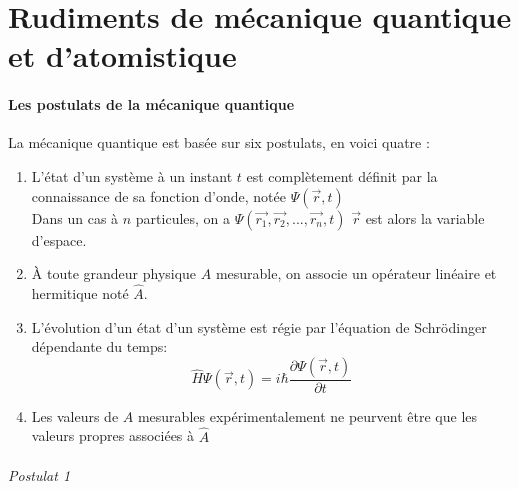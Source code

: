 \documentclass[../main.tex]{subfile}
\begin{document}
\part{Rudiments de mécanique quantique et d'atomistique}
\subsection{Les postulats de la mécanique quantique}

La mécanique quantique est basée sur six postulats, en voici quatre :\\
\begin{enumerate}
         \item L'état d'un système à un instant $t$ est complètement définit par la connaissance de sa fonction d'onde, notée $\Psi(\vec{r}, t)$\\
            Dans un cas à $n$ particules, on a $\Psi(\vec{r_1}, \vec{r_2}, ..., \vec{r_n}, t)$
            $\vec{r}$ est alors la variable d'espace.
         \item \`A toute grandeur physique $A$ mesurable, on associe un opérateur linéaire et hermitique noté $\hat{A}$.
         \item L'évolution d'un état d'un système est régie par l'équation de Schrödinger dépendante du temps:
            $$\hat{H}\Psi(\vec{r}, t) = i\hbar \frac{\partial \Psi (\vec{r}, t)}{\partial t}$$
         \item Les valeurs de $A$ mesurables expérimentalement ne peurvent être que les valeurs propres associées à $\hat{A}$
\end{enumerate}

\paragraph{Postulat 1}
\end{document}
